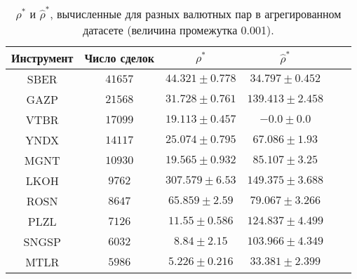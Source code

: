 \begin{table}[h!]
    \begin{center}
        \begin{tabular}{|c|c|c|c|c|c|}
            \hline
            Инструмент & Число сделок & $\rho^*$ & $\hat \rho^*$              \\ \hline
            SBER & $41657$ & $44.321 \pm 0.778$ & $34.797 \pm 0.452$ \\ \hline
            GAZP       & $21568$      & $31.728 \pm 0.761$ & $139.413 \pm 2.458$ \\ \hline
            VTBR       & $17099$      & $19.113 \pm 0.457$ & $-0.0 \pm 0.0$      \\ \hline
            YNDX       & $14117$      & $25.074 \pm 0.795$ & $67.086 \pm 1.93$   \\ \hline
            MGNT       & $10930$      & $19.565 \pm 0.932$ & $85.107 \pm 3.25$   \\ \hline
            LKOH       & $9762$       & $307.579 \pm 6.53$ & $149.375 \pm 3.688$ \\ \hline
            ROSN       & $8647$       & $65.859 \pm 2.59$  & $79.067 \pm 3.266$  \\ \hline
            PLZL       & $7126$       & $11.55 \pm 0.586$  & $124.837 \pm 4.499$ \\ \hline
            SNGSP      & $6032$       & $8.84 \pm 2.15$    & $103.966 \pm 4.349$ \\ \hline
            MTLR       & $5986$       & $5.226 \pm 0.216$  & $33.381 \pm 2.399$  \\ \hline
        \end{tabular}
    \end{center}\caption{$\rho^*$ и $\hat \rho^*$, вычисленные для разных валютных пар в агрегированном датасете (величина промежутка 0.001).}
    \label{Aggreg1CU0.001} \end{table}

